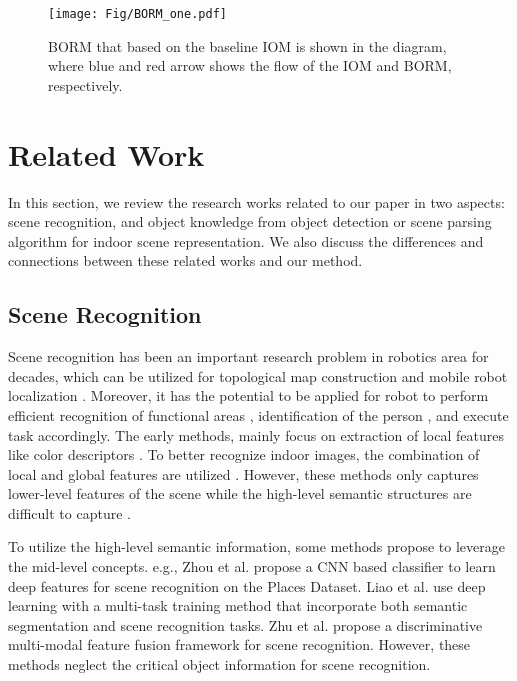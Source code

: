 \documentclass[letterpaper, 10 pt, conference]{ieeeconf}  %
\begin{document}
\begin{figure*}[htb]
	\centering
	\texttt{[image: Fig/BORM\_one.pdf]}
	\caption{BORM that based on the baseline IOM is shown in the diagram, where blue and red arrow shows the flow of the IOM and BORM, respectively.}
	\label{fig:avom}
\end{figure*}

\section{Related Work}
\label{sec:related_work}
In this section, we review the research works related to our paper in two aspects: scene recognition, and object knowledge from object detection or scene parsing algorithm for indoor scene representation. We also discuss the differences and connections between these related works and our method. 



\subsection{Scene Recognition}
Scene recognition has been an important research problem in robotics area for decades, which can be utilized for topological map construction and mobile robot localization \cite{liu2009scene}\cite{Liu2013}\cite{Lin2018}. Moreover, it has the potential to be applied for robot to perform efficient recognition of functional areas \cite{Ye2017}, identification of the person \cite{wang2019learning}, and execute task accordingly. The early methods, mainly focus on extraction of local features like color descriptors \cite{Liu2013}\cite{VanDeSande2009}. 
To better recognize indoor images, the combination of local and global features are utilized \cite{quattoni2009recognizing}. However, these methods only captures lower-level features of the scene while the high-level semantic structures are difficult to capture \cite{Zhu2016}. 

To utilize the high-level semantic information, some methods propose to leverage the mid-level concepts. e.g., Zhou et al. \cite{Zhou2014}\cite{zhou2017places} propose a CNN based classifier to learn deep features for scene recognition on the Places Dataset. Liao et al. \cite{Liao2016} use deep learning with a multi-task training method that incorporate both semantic segmentation and scene recognition tasks. Zhu et al. \cite{Zhu2016} propose a discriminative multi-modal feature fusion framework for scene recognition. However, these methods neglect the critical object information for scene recognition.
\end{document}
